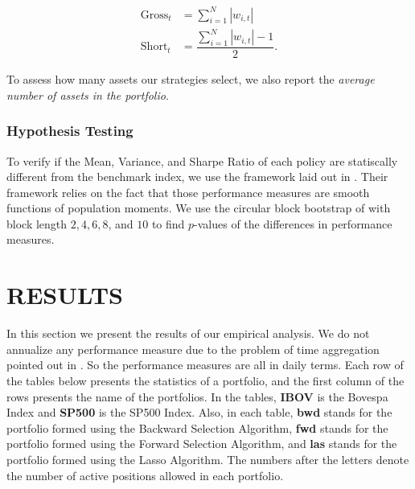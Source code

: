 \documentclass[12pt,oneside,a4paper]{memoir}
\begin{document}
\vspace{-18 pt}
\begin{align*}
\label{gross}
\text{Gross}_{t} &= \sum_{i=1}^{N} |w_{i,t}|
\\
\label{short}
\text{Short}_{t} &= \dfrac{\sum_{i=1}^{N} |w_{i,t}| - 1}{2}.
\end{align*}

To assess how many assets our strategies select, we also report the \textit{average number of assets in the portfolio}.

\subsubsection*{Hypothesis Testing}

To verify if the Mean, Variance, and Sharpe Ratio of each policy are statiscally different from the benchmark index, we use the framework laid out in .
Their framework relies on the fact that those performance measures are smooth functions of population moments.
We use the circular block bootstrap of  with block length $2, 4, 6, 8$, and $10$ to find $p$-values of the differences in performance measures.


\clearpage
\section{RESULTS} \label{sec:results:it}

In this section we present the results of our empirical analysis.
We do not annualize any performance measure due to the problem of time aggregation pointed out in .
So the performance measures are all in daily terms.
Each row of the tables below presents the statistics of a portfolio, and the first column of the rows presents the name of the portfolios.
In the tables, \textbf{IBOV} is the Bovespa Index and \textbf{SP500} is the SP500 Index. 
Also, in each table,
\textbf{bwd} stands for the portfolio formed using the Backward Selection Algorithm, 
\textbf{fwd} stands for the portfolio formed using the Forward Selection Algorithm, and
\textbf{las} stands for the portfolio formed using the Lasso Algorithm.
The numbers after the letters denote the number of active positions allowed in each portfolio.

\end{document}
